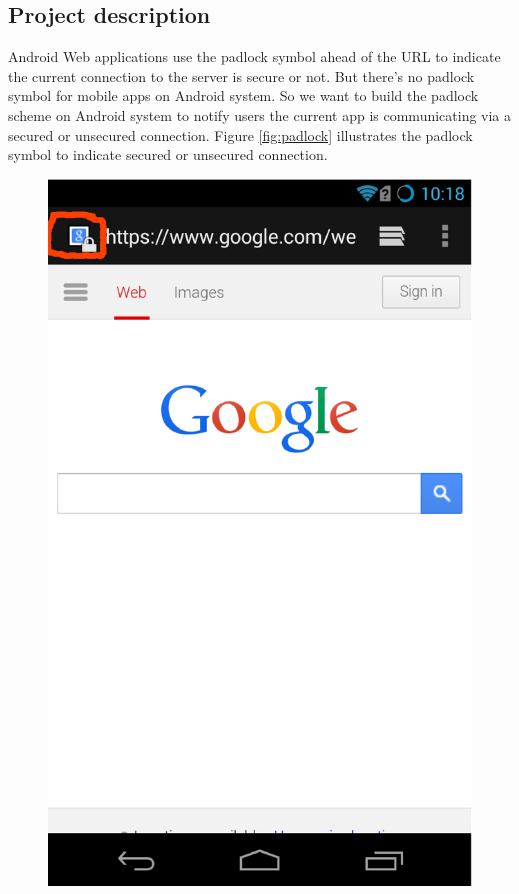 \documentclass[a4paper, 12pt]{article}
\begin{document}
\subsection{Project description}
Android Web applications use the padlock symbol ahead of the URL to indicate the current connection to the server
 is secure or not. But there's no padlock symbol for mobile apps on Android system. So we want to build the padlock 
 scheme on Android system to notify users the current app is communicating via a secured or unsecured connection.
 Figure \ref{fig:padlock} illustrates the padlock symbol to indicate secured or unsecured connection.
\begin{figure}[!htb]
\centering
\includegraphics[scale=.24]{imgs/google-web-marked}\hspace{2em}

\end{figure}
\end{document}
